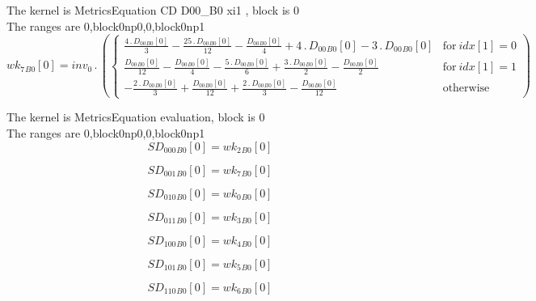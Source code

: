 \documentclass{article}
\begin{document}
\noindent The kernel is MetricsEquation CD D00_B0 xi1 , block is 0\\\noindent The ranges are 0,block0np0,0,block0np1\\\begin{dmath}{wk_{7}{_{B0}}}[{0}] = inv_0 \,.\, \left(\begin{cases} \frac{4 \,.\, {D_{00}{_{B0}}}[{0}]}{3} - \frac{25 \,.\, {D_{00}{_{B0}}}[{0}]}{12} - \frac{{D_{00}{_{B0}}}[{0}]}{4} + 4 \,.\, {D_{00}{_{B0}}}[{0}] - 3 \,.\, {D_{00}{_{B0}}}[{0}] & 
\text{for}\: {idx}[{1}] = 0 \\\frac{{D_{00}{_{B0}}}[{0}]}{12} - \frac{{D_{00}{_{B0}}}[{0}]}{4} - \frac{5 \,.\, {D_{00}{_{B0}}}[{0}]}{6} + \frac{3 \,.\, {D_{00}{_{B0}}}[{0}]}{2} - \frac{{D_{00}{_{B0}}}[{0}]}{2} & \text{for}\: {idx}[{1}] = 1 \\- 
\frac{2 \,.\, {D_{00}{_{B0}}}[{0}]}{3} + \frac{{D_{00}{_{B0}}}[{0}]}{12} + \frac{2 \,.\, {D_{00}{_{B0}}}[{0}]}{3} - \frac{{D_{00}{_{B0}}}[{0}]}{12} & \text{otherwise} \end{cases}\right)\end{dmath}

\noindent The kernel is MetricsEquation evaluation, block is 0\\\noindent The ranges are 0,block0np0,0,block0np1\\\begin{dmath}{SD_{000}{_{B0}}}[{0}] = {wk_{2}{_{B0}}}[{0}]\end{dmath}

\begin{dmath}{SD_{001}{_{B0}}}[{0}] = {wk_{7}{_{B0}}}[{0}]\end{dmath}

\begin{dmath}{SD_{010}{_{B0}}}[{0}] = {wk_{0}{_{B0}}}[{0}]\end{dmath}

\begin{dmath}{SD_{011}{_{B0}}}[{0}] = {wk_{3}{_{B0}}}[{0}]\end{dmath}

\begin{dmath}{SD_{100}{_{B0}}}[{0}] = {wk_{4}{_{B0}}}[{0}]\end{dmath}

\begin{dmath}{SD_{101}{_{B0}}}[{0}] = {wk_{5}{_{B0}}}[{0}]\end{dmath}

\begin{dmath}{SD_{110}{_{B0}}}[{0}] = {wk_{6}{_{B0}}}[{0}]\end{dmath}
\end{document}
